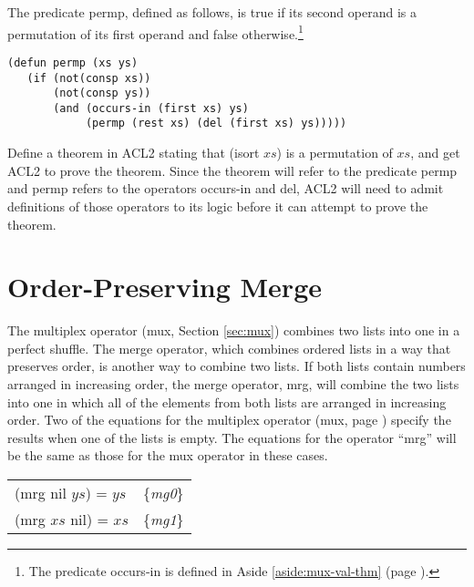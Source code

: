 \begin{ExerciseList}
\Exercise \label{ex:permp-isort}
The predicate 
permp,
defined as follows, is true if its second operand
is a permutation of its first operand and false otherwise.\footnote{The
predicate occurs-in is defined in
Aside \ref{aside:mux-val-thm} (page \pageref{aside:mux-val-thm}).}
\label{defun:permp}
\begin{Verbatim}
(defun permp (xs ys)
   (if (not(consp xs))
       (not(consp ys))
       (and (occurs-in (first xs) ys)
            (permp (rest xs) (del (first xs) ys)))))
\end{Verbatim}
Define a theorem in ACL2 stating that (isort $xs$) is a
permutation of $xs$, and
get ACL2 to prove the theorem.
Since the theorem will refer to the predicate permp
and permp refers to the operators occurs-in and del,
ACL2 will need to admit definitions of those operators
to its logic before it can attempt to prove the theorem.

\end{ExerciseList}

\section{Order-Preserving Merge}
\label{sec:mrg}

The multiplex operator (mux, Section \ref{sec:mux})
combines two lists into one in a perfect shuffle.
The merge operator, which combines ordered lists
in a way that preserves order, is another way to combine two lists.
If both lists contain numbers arranged in increasing order,
the merge operator, mrg,
will combine the two lists
into one in which all of the elements from both lists
are arranged in increasing order.
Two of the equations for the multiplex operator (mux, page \pageref{def:mux})
specify the results when one of the lists is empty.
The equations for the operator ``mrg'' will be the same as those for
the mux operator in these cases.

\begin{center}
\begin{tabular}{ll}
(mrg nil $ys$) = $ys$ & \{\emph{mg0}\} \\
(mrg $xs$ nil) = $xs$ & \{\emph{mg1}\} \\
\end{tabular}
\end{center}

